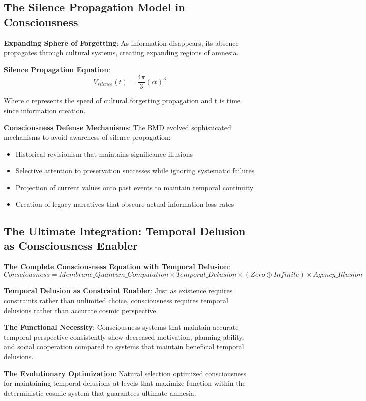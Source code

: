 \documentclass[12pt]{article}
\begin{document}
\subsection{The Silence Propagation Model in Consciousness}

\textbf{Expanding Sphere of Forgetting}: As information disappears, its absence propagates through cultural systems, creating expanding regions of amnesia.

\textbf{Silence Propagation Equation}:
$$V_{silence}(t) = \frac{4\pi}{3}(ct)^3$$

Where c represents the speed of cultural forgetting propagation and t is time since information creation.

\textbf{Consciousness Defense Mechanisms}: The BMD evolved sophisticated mechanisms to avoid awareness of silence propagation:
\begin{itemize}
\item Historical revisionism that maintains significance illusions
\item Selective attention to preservation successes while ignoring systematic failures
\item Projection of current values onto past events to maintain temporal continuity
\item Creation of legacy narratives that obscure actual information loss rates
\end{itemize}

\subsection{The Ultimate Integration: Temporal Delusion as Consciousness Enabler}

\textbf{The Complete Consciousness Equation with Temporal Delusion}:
$$Consciousness = Membrane\_Quantum\_Computation \times Temporal\_Delusion \times (Zero \oplus Infinite) \times Agency\_Illusion$$

\textbf{Temporal Delusion as Constraint Enabler}: Just as existence requires constraints rather than unlimited choice, consciousness requires temporal delusions rather than accurate cosmic perspective.

\textbf{The Functional Necessity}: Consciousness systems that maintain accurate temporal perspective consistently show decreased motivation, planning ability, and social cooperation compared to systems that maintain beneficial temporal delusions.

\textbf{The Evolutionary Optimization}: Natural selection optimized consciousness for maintaining temporal delusions at levels that maximize function within the deterministic cosmic system that guarantees ultimate amnesia.
\end{document}
